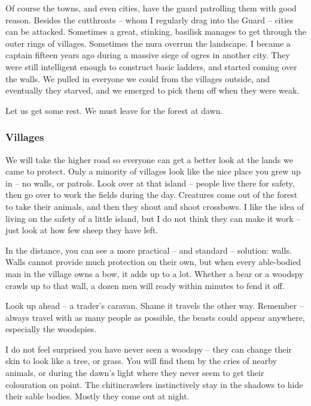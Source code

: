 \begin{multicols}{2}
\begin{exampletext}
  Of course the towns, and even cities, have the \gls{guard} patrolling them with good reason.
  Besides the cutthroats -- whom I regularly drag into the Guard -- cities can be attacked.
  Sometimes a great, stinking, basilisk manages to get through the outer rings of villages.
  Sometimes the nura overrun the landscape.
  I became a captain fifteen years ago during a massive siege of ogres in another city.
  They were still intelligent enough to construct basic ladders, and started coming over the walls.
  We pulled in everyone we could from the villages outside, and eventually they starved, and we emerged to pick them off when they were weak.

  Let us get some rest.
  We must leave for the forest at dawn.

\end{exampletext}

\subsubsection{Villages}

\begin{exampletext}

  We will take the higher road so everyone can get a better look at the lands we came to protect.
  Only a minority of villages look like the nice place you grew up in -- no walls, or patrols.
  Look over at that island -- people live there for safety, then go over to work the fields during the day.
  Creatures come out of the forest to take their animals, and then they shout and shoot crossbows.
  I like the idea of living on the safety of a little island, but I do not think they can make it work -- just look at how few sheep they have left.

  In the distance, you can see a more practical -- and standard -- solution: walls.
  Walls cannot provide much protection on their own, but when every able-bodied man in the village owns a bow, it adds up to a lot.
  Whether a bear or a woodspy crawls up to that wall, a dozen men will ready within minutes to fend it off.

  Look up ahead -- a trader's caravan.
  Shame it travels the other way.
  Remember -- always travel with as many people as possible, the beasts could appear anywhere, especially the woodspies.

  I do not feel surprised you have never seen a woodspy -- they can change their skin to look like a tree, or grass.
  You will find them by the cries of nearby animals, or during the dawn's light where they never seem to get their colouration on point.
  The chitincrawlers instinctively stay in the shadows to hide their sable bodies.
  Mostly they come out at night.


\end{exampletext}
\end{multicols}
